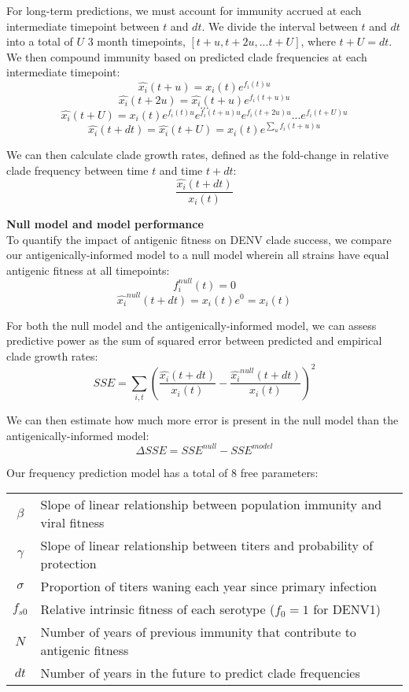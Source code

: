 \documentclass[11pt,oneside,letterpaper]{article}
\begin{document}
For long-term predictions, we must account for immunity accrued at each intermediate timepoint between $t$ and $dt$.
We divide the interval between $t$ and $dt$ into a total of $U$ 3 month timepoints, $[t+u, t+2u, ... t+U]$, where $t+U=dt$.
We then compound immunity based on predicted clade frequencies at each intermediate timepoint:
$$\hat{x_i}(t+u) = x_i(t)e^{f_i(t) u}$$
$$\hat{x_i}(t+2u) = \hat{x_i}(t+u) e^{f_i(t+u)u}$$
$$...$$
$$\hat{x_i}(t+U) = x_i(t) e^{f_i(t)u} e^{f_i(t+u)u} e^{f_i(t+2u)u} ... e^{f_i(t+U)u}$$
$$\hat{x_i}(t+dt) = \hat{x_i}(t+U) = x_i(t) e^{\sum_{u}f_i(t+u)u}$$

We can then calculate clade growth rates, defined as the fold-change in relative clade frequency between time $t$ and time $t+dt$:
$$\frac{\hat{x_i}(t+dt)}{x_i(t)}$$

\textbf{Null model and model performance}\\
To quantify the impact of antigenic fitness on DENV clade success, we compare our antigenically-informed model to a null model wherein all strains have equal antigenic fitness at all timepoints:
$$f_i^{null}(t) = 0$$
$$\hat{x_i}^{null}(t+dt) = x_i(t) e^0 = x_i(t)$$

For both the null model and the antigenically-informed model, we can assess predictive power as the sum of squared error between predicted and empirical clade growth rates:
$$SSE = \sum_{i,t} (\frac{\hat{x_i}(t+dt)}{x_i(t)} - \frac{\hat{x_i}^{null}(t+dt)}{x_i(t)})^2$$

We can then estimate how much more error is present in the null model than the antigenically-informed model:
$$\Delta SSE = SSE^{null} - SSE^{model}$$

Our frequency prediction model has a total of 8 free parameters:
\begin{table}[h!]
  \begin{center}
    \label{tab:table1}
    \begin{tabular}{c|l}
      $\beta$ & Slope of linear relationship between population immunity and viral fitness\\
      $\gamma$ & Slope of linear relationship between titers and probability of protection\\
      $\sigma$ & Proportion of titers waning each year since primary infection\\
      $f_{s0}$ & Relative intrinsic fitness of each serotype ($f_0 = 1$ for DENV1)\\
      $N$ & Number of years of previous immunity that contribute to antigenic fitness\\
      $dt$ & Number of years in the future to predict clade frequencies\\
    \end{tabular}
  \end{center}
\end{table}
\end{document}
